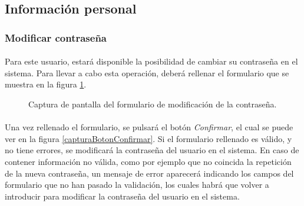 \subsection{Información personal}

  \subsubsection{Modificar contraseña}\label{modificarPassword}

  \paragraph{}Para este usuario, estará disponible la posibilidad de cambiar su
  contraseña en el sistema. Para llevar a cabo esta operación, deberá rellenar
  el formulario que se muestra en la figura
  \ref{capturaPantallaModificarPassword}.

  \begin{figure}[!ht]
    \begin{center}
      \caption{Captura de pantalla del formulario de modificación de la contraseña.}
      \label{capturaPantallaModificarPassword}
    \end{center}
  \end{figure}

  \paragraph{}Una vez rellenado el formulario, se pulsará el botón
  \textit{Confirmar}, el cual se puede ver en la figura
  \ref{capturaBotonConfirmar}. Si el formulario rellenado es válido, y no tiene
  errores, se modificará la contraseña del usuario en el sistema. En caso de
  contener información no válida, como por ejemplo que no coincida la repetición
  de la nueva contraseña, un mensaje de error aparecerá indicando los campos
  del formulario que no han pasado la validación, los cuales habrá que volver
  a introducir para modificar la contraseña del usuario en el sistema.
